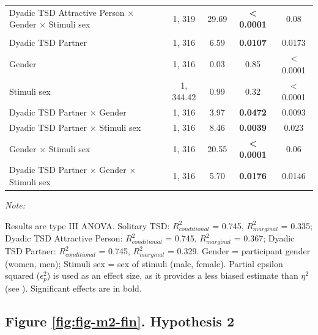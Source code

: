 \documentclass[
  bookmarksnumbered]{article}
\begin{document}
\begin{table}[H]
{\begin{threeparttable}
\begin{tabular}[t]{lcccc}
\hspace{1em}Dyadic TSD Attractive Person × Gender × Stimuli sex & 1, 319 & 29.69 & \textbf{< 0.0001} & 0.08\\
\addlinespace[0.3em]
\multicolumn{5}{l}{\cellcolor{lightgray}{Dyadic TSD Partner}}\\
\hspace{1em}Dyadic TSD Partner & 1, 316 & 6.59 & \textbf{0.0107} & 0.0173\\
\hspace{1em}Gender & 1, 316 & 0.03 & 0.85 & < 0.0001\\
\hspace{1em}Stimuli sex & 1, 344.42 & 0.99 & 0.32 & < 0.0001\\
\hspace{1em}Dyadic TSD Partner × Gender & 1, 316 & 3.97 & \textbf{0.0472} & 0.0093\\
\hspace{1em}Dyadic TSD Partner × Stimuli sex & 1, 316 & 8.46 & \textbf{0.0039} & 0.023\\
\hspace{1em}Gender × Stimuli sex & 1, 316 & 20.55 & \textbf{< 0.0001} & 0.06\\
\hspace{1em}Dyadic TSD Partner × Gender × Stimuli sex & 1, 316 & 5.70 & \textbf{0.0176} & 0.0146\\
\bottomrule
\end{tabular}
\begin{tablenotes}[para]
\item \textit{Note: } 
\item Results are type III ANOVA. Solitary TSD: $R^2_{conditional}$ = 0.745, $R^2_{marginal}$ = 0.335; Dyadic TSD Attractive Person: $R^2_{conditional}$ = 0.745, $R^2_{marginal}$ = 0.367; Dyadic TSD Partner: $R^2_{conditional}$ = 0.745, $R^2_{marginal}$ = 0.329. Gender = participant gender (women, men); Stimuli sex = sex of stimuli (male, female).
      Partial epsilon squared ($\epsilon^2_p$) is used as an effect size, as it provides
      a less biased estimate than $\eta^2$ (see \cite{albersWhenPowerAnalyses2018}).
      Significant effects are in bold.
\end{tablenotes}
\end{threeparttable}}
\end{table}

\subsection{Figure \ref{fig:fig-m2-fin}. Hypothesis 2}\label{figure-reffigfig-m2-fin.-hypothesis-2}
\end{document}
